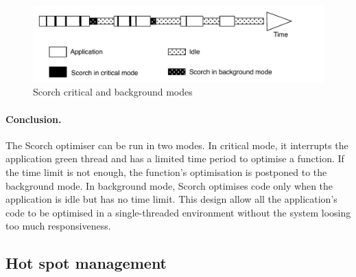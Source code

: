 \documentclass[a4paper,12pt,twoside]{../includes/ThesisStyle}
\begin{document}
\begin{figure}[h!]
    \begin{center}
        \includegraphics[width=0.95\linewidth]{ScorchModes}
        \caption{Scorch critical and background modes}
        \label{fig:ScorchModes}
    \end{center}
\end{figure}


\paragraph{Conclusion.}The Scorch optimiser can be run in two modes. In critical mode, it interrupts the application green thread and has a limited time period to optimise a function. If the time limit is not enough, the function's optimisation is postponed to the background mode. In background mode, Scorch optimises code only when the application is idle but has no time limit. This design allow all the application's code to be optimised in a single-threaded environment without the system loosing too much responsiveness.

\subsection{Hot spot management}
\label{sec:hotSpot}
\end{document}

